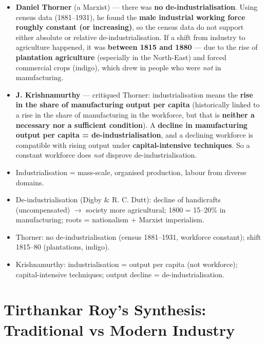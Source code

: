\begin{KeyConcept}
\begin{itemize}
\item \textbf{Daniel Thorner} (a Marxist) --- there was \textbf{no de-industrialisation}. Using census data (1881--1931), he found the \textbf{male industrial working force roughly constant (or increasing)}, so the census data do not support either absolute or relative de-industrialisation. If a shift from industry to agriculture happened, it was \textbf{between 1815 and 1880} --- due to the rise of \textbf{plantation agriculture} (especially in the North-East) and forced commercial crops (indigo), which drew in people who were \emph{not} in manufacturing.
\item \textbf{J. Krishnamurthy} --- critiqued Thorner: industrialisation means the \textbf{rise in the share of manufacturing output per capita} (historically linked to a rise in the share of manufacturing in the workforce, but that is \textbf{neither a necessary nor a sufficient condition}). A \textbf{decline in manufacturing output per capita = de-industrialisation}, and a declining workforce is compatible with rising output under \textbf{capital-intensive techniques}. So a constant workforce does \emph{not} disprove de-industrialisation.
\end{itemize}
\end{KeyConcept}

\begin{QuickRevision}
\begin{itemize}
\item Industrialisation = mass-scale, organised production, labour from diverse domains.
\item De-industrialisation (Digby \& R. C. Dutt): decline of handicrafts (uncompensated) $\rightarrow$ society more agricultural; 1800 = 15--20\% in manufacturing; roots = nationalism + Marxist imperialism.
\item Thorner: no de-industrialisation (census 1881--1931, workforce constant); shift 1815--80 (plantations, indigo).
\item Krishnamurthy: industrialisation = output per capita (not workforce); capital-intensive techniques; output decline = de-industrialisation.
\end{itemize}
\end{QuickRevision}

\section{Tirthankar Roy's Synthesis: Traditional vs Modern Industry}

